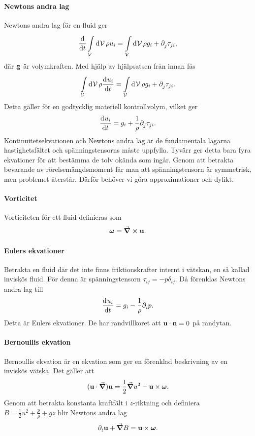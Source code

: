 \paragraph{Newtons andra lag}
Newtons andra lag för en fluid ger
\begin{align*}
	\dv{t}\int\limits_{\mathcal{V}}^{}\dd[]{\mathcal{V}}\rho u_{i} = \int\limits_{\mathcal{V}}^{}\dd[]{\mathcal{V}}\rho g_{i} + \partial_{j}^{}\tau_{ji},
\end{align*}
där $\vb{g}$ är volymkraften. Med hjälp av hjälpsatsen från innan fås
\begin{align*}
	\int\limits_{\mathcal{V}}^{}\dd[]{\mathcal{V}}\rho\dv[]{u_{i}}{t} = \int\limits_{\mathcal{V}}^{}\dd[]{\mathcal{V}}\rho g_{i} + \partial_{j}^{}\tau_{ji}.
\end{align*}
Detta gäller för en godtycklig materiell kontrollvolym, vilket ger
\begin{align*}
	\dv[]{u_{i}}{t} = g_{i} + \frac{1}{\rho}\partial_{j}^{}\tau_{ji}.
\end{align*}
Kontinuitetsekvationen och Newtons andra lag är de fundamentala lagarna hastighetsfältet och spänningstensorns måste uppfylla. Tyvärr ger detta bara fyra ekvationer för att bestämma de tolv okända som ingår. Genom att betrakta bevarande av rörelsemängdsmoment får man att spänningstensorn är symmetrisk, men problemet återstår. Därför behöver vi göra approximationer och dylikt.

\paragraph{Vorticitet}
Vorticiteten för ett fluid definieras som
\begin{align*}
	\vb*{\omega} = \curl{\vb{u}}.
\end{align*}

\paragraph{Eulers ekvationer}
Betrakta en fluid där det inte finns friktionskrafter internt i vätskan, en så kallad inviskös fluid. För denna är spänningstensorn $\tau_{ij} = -p\delta_{ij}$. Då förenklas Newtons andra lag till
\begin{align*}
	\dv[]{u_{i}}{t} = g_{i} - \frac{1}{\rho}\partial_{i}^{}p.
\end{align*}
Detta är Eulers ekvationer. De har randvillkoret att $\vb{u}\cdot\vb{n} = 0$ på randytan.

\paragraph{Bernoullis ekvation}
Bernoullis ekvation är en ekvation som ger en förenklad beskrivning av en inviskös vätska. Det gäller att
\begin{align*}
	(\vb{u}\cdot\grad)\vb{u} = \frac{1}{2}\grad{u^{2}} - \vb{u}\times\vb*{\omega}.
\end{align*}
Genom att betrakta konstanta kraftfält i $z$-riktning och definiera $B = \frac{1}{2}u^{2} + \frac{p}{\rho} + gz$ blir Newtons andra lag
\begin{align*}
	\partial_{t}^{}\vb{u} + \grad{B} = \vb{u}\times\vb*{\omega}.
\end{align*}

